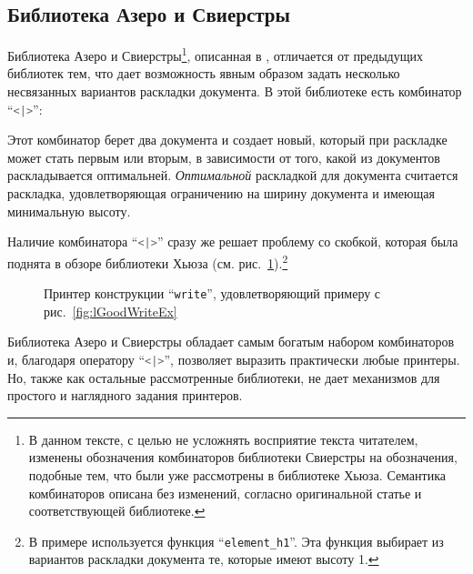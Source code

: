 \newpage

\subsection{Библиотека Азеро и Свиерстры}

Библиотека Азеро и Свиерстры\footnote{
В данном тексте, с целью не усложнять восприятие текста читателем, изменены обозначения комбинаторов библиотеки Свиерстры на обозначения, подобные тем, что были уже рассмотрены в библиотеке Хьюза. Семантика комбинаторов описана без изменений, согласно оригинальной статье и соответствующей библиотеке.
}, описанная в \cite{swierstra}, отличается от предыдущих библиотек тем, что дает возможность явным образом задать несколько несвязанных вариантов раскладки документа. В этой библиотеке есть комбинатор “\lstinline[language=Haskell]{<|>}”:



Этот комбинатор берет два документа и создает новый, который при раскладке может стать первым или вторым, в зависимости от того, какой из документов раскладывается оптимальней. \textit{Оптимальной} раскладкой для документа считается раскладка, удовлетворяющая ограничению на ширину документа и имеющая минимальную высоту.

Наличие комбинатора “\lstinline[language=Haskell]{<|>}” сразу же решает проблему со скобкой, которая была поднята в обзоре библиотеки Хьюза (см. рис.~\ref{fig:bracketSwierstra}).\footnote{
	В примере используется функция “\lstinline[language=Haskell]{element_h1}”. Эта функция выбирает из вариантов раскладки документа те, которые имеют высоту 1.
}

\begin{figure}[h!]
	
	\caption{Принтер конструкции “\lstinline{write}”, удовлетворяющий примеру с рис.~\ref{fig:lGoodWriteEx}}
	\label{fig:bracketSwierstra}
\end{figure}

Библиотека Азеро и Свиерстры обладает самым богатым набором комбинаторов и, благодаря оператору “\lstinline[language=Haskell]{<|>}”, позволяет выразить практически любые принтеры. Но, также как остальные рассмотренные библиотеки, не дает механизмов для простого и наглядного задания принтеров.